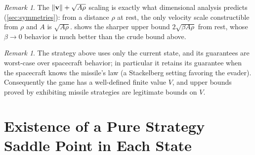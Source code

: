 \documentclass{article}
\renewcommand{\vec}[1]{\mathbf{#1}}
\theoremstyle{remark}
\newtheorem{remark}[theorem]{Remark}
\begin{document}
\begin{remark}
  The $\norm{\vec v} + \sqrt{A\rho}$ scaling is exactly what dimensional
  analysis predicts (\cref{sec:symmetries}): from a distance $\rho$ at rest, the
  only velocity scale constructible from $\rho$ and $A$ is $\sqrt{A\rho}$.
   shows the sharper upper bound $2\sqrt{\beta A \rho}$ from
  rest, whose $\beta \to 0$ behavior is much better than the crude bound above.
\end{remark}

\begin{remark}
  The strategy above uses only the current state, and its guarantees are
  worst-case over spacecraft behavior; in particular it retains its guarantee
  when the spacecraft knows the missile's law (a Stackelberg setting favoring
  the evader).  Consequently the game has a well-defined finite value $V$, and
  upper bounds proved by exhibiting missile strategies are legitimate bounds on
  $V$.
\end{remark}

\section{Existence of a Pure Strategy Saddle Point in Each State}
\label{sec:equilibrium}
\end{document}

